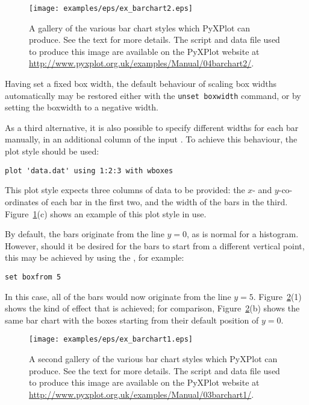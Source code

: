 \begin{figure}
\begin{center}
\texttt{[image: examples/eps/ex\_barchart2.eps]}
\end{center}
\caption[A gallery of the various bar chart styles which PyXPlot can produce]
{A gallery of the various bar chart styles which PyXPlot can produce.
See the text for more details.  The script and data file used to produce this
image are available on the PyXPlot website at
\protect\url{http://www.pyxplot.org.uk/examples/Manual/04barchart2/}.}
\label{fig:ex_barchart2}
\end{figure}

Having set a fixed box width, the default behaviour of scaling box widths
automatically may be restored either with the {\tt unset boxwidth} command,
or by setting the boxwidth to a negative width.

As a third alternative, it is also possible to specify different widths for
each bar manually, in an additional column of the input \datafile. To achieve
this behaviour, the  plot style should be used:

\begin{verbatim}
plot 'data.dat' using 1:2:3 with wboxes
\end{verbatim}

\noindent This plot style expects three columns of data to be provided: the
$x$- and $y$-co-ordinates of each bar in the first two, and the width of the
bars in the third.  Figure~\ref{fig:ex_barchart2}(c) shows an example of this
plot style in use.

By default, the bars originate from the line $y=0$, as is normal for a
histogram. However, should it be desired for the bars to start from a different
vertical point, this may be achieved by using the ,
for example:

\begin{verbatim}
set boxfrom 5
\end{verbatim}

\noindent In this case, all of the bars would now originate from the line
$y=5$. Figure~\ref{fig:ex_barchart1}(1) shows the kind of effect that is
achieved; for comparison, Figure~\ref{fig:ex_barchart1}(b) shows the same bar
chart with the boxes starting from their default position of $y=0$.

\begin{figure}
\begin{center}
\texttt{[image: examples/eps/ex\_barchart1.eps]}
\end{center}
\caption[A second gallery of the various bar chart styles which PyXPlot can
produce]
{A second gallery of the various bar chart styles which PyXPlot can
produce. See the text for more details.  The script and data file used to
produce this image are available on the PyXPlot website at
\protect\url{http://www.pyxplot.org.uk/examples/Manual/03barchart1/}.}
\label{fig:ex_barchart1}
\end{figure}


